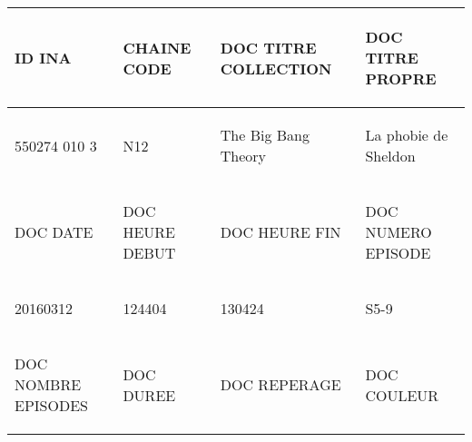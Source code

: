 \begin{table}
	\centering
	\begin{tabularx}{16cm}{|X|X|X|X|}
		\hline
		 \begin{center}ID INA\end{center}&\begin{center}CHAINE CODE\end{center}&\begin{center}DOC TITRE COLLECTION\end{center}&\begin{center}DOC TITRE PROPRE\end{center}  \tabularnewline \hline
		 \begin{center}550274 010 3\end{center}&\begin{center}N12\end{center}&\begin{center}The Big Bang Theory\end{center}&\begin{center}La phobie de Sheldon\end{center}  \tabularnewline \hline
		 \begin{center}DOC DATE\end{center}&\begin{center}DOC HEURE DEBUT\end{center}&\begin{center}DOC HEURE FIN\end{center}&\begin{center}DOC NUMERO EPISODE\end{center}  \tabularnewline \hline
		 \begin{center}20160312\end{center}&\begin{center}124404\end{center}&\begin{center}130424\end{center}&\begin{center}S5-9\end{center}  \tabularnewline \hline
		 \begin{center}DOC NOMBRE EPISODES\end{center}&\begin{center}DOC DUREE\end{center}&\begin{center}DOC REPERAGE\end{center}&\begin{center}DOC COULEUR\end{center}  \tabularnewline \hline

\end{tabularx}
\end{table}

